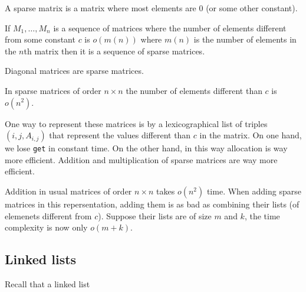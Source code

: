 \documentclass[11pt,a4paper]{article}
\begin{document}
\begin{example}
  A sparse matrix is a matrix where most elements are $0$ (or some other
  constant).

  \begin{definition}
    If $M_1,\dots,M_n$ is a sequence of matrices where the number of elements
    different from some constant $c$ is $o(m(n))$ where $m(n)$ is the number
    of elements in the $n$th matrix then it is a sequence of sparse matrices.
  \end{definition}

  \begin{example}
    Diagonal matrices are sparse matrices.
  \end{example}

  \begin{remark}
    In sparse matrices of order $n \times n$ the number of elements different
    than $c$ is $o(n^2)$.
  \end{remark}

  One way to represent these matrices is by a lexicographical list
  of triples $(i,j,A_{i,j})$ that represent the values different than $c$
  in the matrix.
  On one hand, we lose \texttt{get} in constant time.
  On the other hand, in this way allocation is way more efficient.
  Addition and multiplication of sparse matrices are way more efficient.

  \begin{example}
    Addition in usual matrices of order $n \times n$ takes $o(n^2)$ time.
    When adding sparse matrices in this repersentation, adding them is as
    bad as combining their lists (of elemenets different from $c$).
    Suppose their lists are of size $m$ and $k$, the time complexity is
    now only $o(m + k)$.
  \end{example}
\end{example}

\subsection{Linked lists}

Recall that a linked list

%
%
%
%
%
%
%
%
%
%
%
\end{document}
